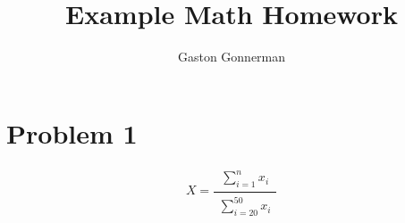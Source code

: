 \documentclass{article}
\title{Example Math Homework}
\author{Gaston Gonnerman}
\date{}
\begin{document}
\maketitle{}

\section{Problem 1}

\begin{equation*}
    X =
    \frac{\substack{\sum_{i=1}^{n}{x_i}}}
    {\substack{\sum_{i=20}^{50}{x_i}}}
\end{equation*}
\end{document}

